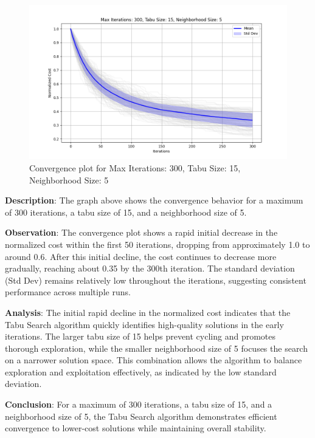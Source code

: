 \documentclass{article}
\begin{document}
    \begin{figure}[H]
        \centering
        \includegraphics[width=\textwidth]{tabu_search/max_iter_300_tabu_size_15_neighborhood_size_5}
        \caption{Convergence plot for Max Iterations: 300, Tabu Size: 15, Neighborhood Size: 5}
        \label{fig:ts_300_15_5}
    \end{figure}

    \textbf{Description}: The graph above shows the convergence behavior for a maximum of 300 iterations, a tabu size of 15, and a neighborhood size of 5.

    \textbf{Observation}: The convergence plot shows a rapid initial decrease in the normalized cost within the first 50 iterations, dropping from approximately 1.0 to around 0.6. After this initial decline, the cost continues to decrease more gradually, reaching about 0.35 by the 300th iteration. The standard deviation (Std Dev) remains relatively low throughout the iterations, suggesting consistent performance across multiple runs.

    \textbf{Analysis}: The initial rapid decline in the normalized cost indicates that the Tabu Search algorithm quickly identifies high-quality solutions in the early iterations. The larger tabu size of 15 helps prevent cycling and promotes thorough exploration, while the smaller neighborhood size of 5 focuses the search on a narrower solution space. This combination allows the algorithm to balance exploration and exploitation effectively, as indicated by the low standard deviation.

    \textbf{Conclusion}: For a maximum of 300 iterations, a tabu size of 15, and a neighborhood size of 5, the Tabu Search algorithm demonstrates efficient convergence to lower-cost solutions while maintaining overall stability.
\end{document}
